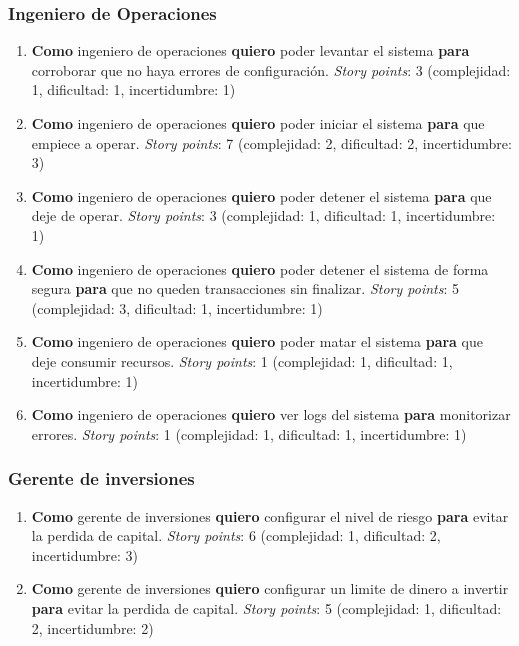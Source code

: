 \documentclass[
    11pt, %
]{charter}
\begin{document}
    \subsubsection{Ingeniero de Operaciones}
    \begin{enumerate}
    \item \textbf{Como} ingeniero de operaciones \textbf{quiero} poder levantar el sistema \textbf{para} corroborar que no haya errores de configuración.
      \textit{Story points}: 3  (complejidad: 1, dificultad: 1, incertidumbre: 1)
    \item \textbf{Como} ingeniero de operaciones \textbf{quiero} poder iniciar el sistema \textbf{para} que empiece a operar.
      \textit{Story points}: 7  (complejidad: 2, dificultad: 2, incertidumbre: 3)
    \item \textbf{Como} ingeniero de operaciones \textbf{quiero} poder detener el sistema \textbf{para} que deje de operar.
      \textit{Story points}: 3  (complejidad: 1, dificultad: 1, incertidumbre: 1)
    \item \textbf{Como} ingeniero de operaciones \textbf{quiero} poder detener el sistema de forma segura \textbf{para} que no queden transacciones sin finalizar.
      \textit{Story points}: 5  (complejidad: 3, dificultad: 1, incertidumbre: 1)
    \item \textbf{Como} ingeniero de operaciones \textbf{quiero} poder matar el sistema \textbf{para} que deje consumir recursos.
      \textit{Story points}: 1  (complejidad: 1, dificultad: 1, incertidumbre: 1)
    \item \textbf{Como} ingeniero de operaciones \textbf{quiero} ver logs del sistema  \textbf{para} monitorizar errores.
      \textit{Story points}: 1  (complejidad: 1, dificultad: 1, incertidumbre: 1)
    \end{enumerate}

    \subsubsection{Gerente de inversiones}
    \begin{enumerate}
    \item \textbf{Como} gerente de inversiones  \textbf{quiero} configurar el nivel de riesgo \textbf{para} evitar la perdida de capital.
      \textit{Story points}: 6  (complejidad: 1, dificultad: 2, incertidumbre: 3)
    \item \textbf{Como} gerente de inversiones \textbf{quiero} configurar un limite de dinero a invertir \textbf{para} evitar la perdida de capital.
      \textit{Story points}: 5  (complejidad: 1, dificultad: 2, incertidumbre: 2)
    \end{enumerate}
\end{document}

